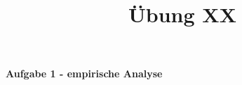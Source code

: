 \documentclass[a4paper,11pt]{scrartcl}
\title{Übung XX}
\begin{document}
\begin{center}
\LARGE{\textbf{Aufgabe 1 - empirische Analyse}}
\end{center}
\end{document}
